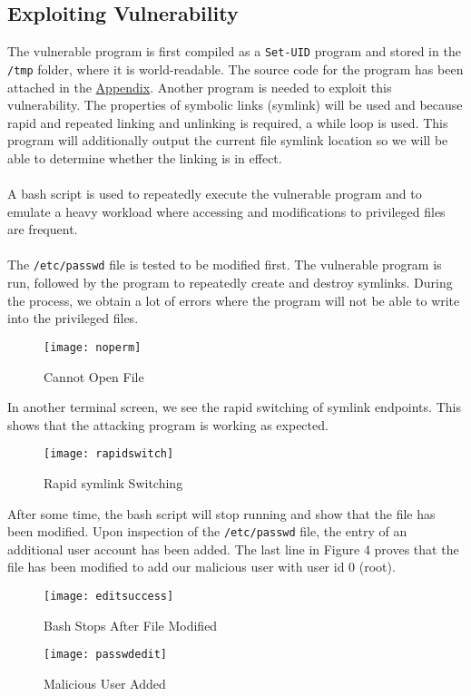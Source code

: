 \documentclass[a4paper,12pt]{article}
\begin{document}
 \subsection{Exploiting Vulnerability}
The vulnerable program is first compiled as a \texttt{Set-UID} program and stored in the \texttt{/tmp} folder, where it is world-readable. The source code for the program has been attached in the \hyperref[Appsec:3.2]{Appendix}. Another program is needed to exploit this vulnerability. The properties of symbolic links (symlink) will be used and because rapid and repeated linking and unlinking is required, a while loop is used. This program will additionally output the current file symlink location so we will be able to determine whether the linking is in effect.\\\\A bash script is used to repeatedly execute the vulnerable program and to emulate a heavy workload where accessing and modifications to privileged files are frequent.\\\\The \texttt{/etc/passwd} file is tested to be modified first. The vulnerable program is run, followed by the program to repeatedly create and destroy symlinks. During the process, we obtain a lot of errors where the program will not be able to write into the privileged files.
\begin{figure}[H]
	\centering
	\texttt{[image: noperm]}
	\caption{Cannot Open File}
	\label{fig:noperm}
\end{figure}
\noindent In another terminal screen, we see the rapid switching of symlink endpoints. This shows that the attacking program is working as expected.
\begin{figure}[H]
	\centering
	\texttt{[image: rapidswitch]}
	\caption{Rapid symlink Switching}
	\label{fig:rapidswitch}
\end{figure}
\noindent After some time, the bash script will stop running and show that the file has been modified. Upon inspection of the \texttt{/etc/passwd} file, the entry of an additional user account has been added. The last line in Figure 4 proves that the file has been modified to add our malicious user with user id 0 (root).
\begin{figure}[H]
	\centering
	\texttt{[image: editsuccess]}
	\caption{Bash Stops After File Modified}
	\label{fig:editsuccess}
\end{figure}
\begin{figure}[H]
	\centering
	\texttt{[image: passwdedit]}
	\caption{Malicious User Added}
	\label{fig:passwdedit}
\end{figure}
\end{document}
